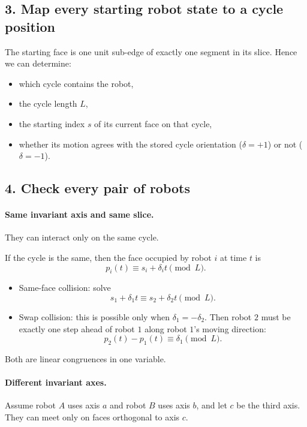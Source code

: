 \documentclass[11pt]{article}
\begin{document}
\subsection*{3. Map every starting robot state to a cycle position}

The starting face is one unit sub-edge of exactly one segment in its slice.
Hence we can determine:
\begin{itemize}[leftmargin=*]
    \item which cycle contains the robot,
    \item the cycle length $L$,
    \item the starting index $s$ of its current face on that cycle,
    \item whether its motion agrees with the stored cycle orientation ($\delta = +1$) or not ($\delta = -1$).
\end{itemize}

\subsection*{4. Check every pair of robots}

\paragraph{Same invariant axis and same slice.}
They can interact only on the same cycle.

If the cycle is the same, then the face occupied by robot $i$ at time $t$ is
\[
    p_i(t) \equiv s_i + \delta_i t \pmod L.
\]

\begin{itemize}[leftmargin=*]
    \item Same-face collision: solve
    \[
        s_1 + \delta_1 t \equiv s_2 + \delta_2 t \pmod L.
    \]
    \item Swap collision: this is possible only when $\delta_1 = -\delta_2$.
    Then robot $2$ must be exactly one step ahead of robot $1$ along robot $1$'s moving direction:
    \[
        p_2(t) - p_1(t) \equiv \delta_1 \pmod L.
    \]
\end{itemize}

Both are linear congruences in one variable.

\paragraph{Different invariant axes.}
Assume robot $A$ uses axis $a$ and robot $B$ uses axis $b$, and let $c$ be the third axis.
They can meet only on faces orthogonal to axis $c$.
\end{document}
